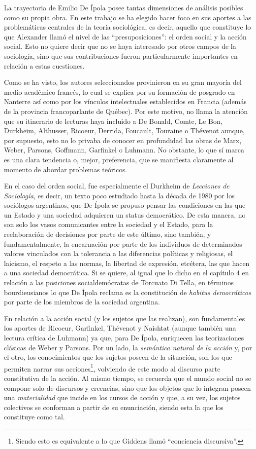 La trayectoria de Emilio De Ípola posee tantas dimensiones de análisis posibles como su propia obra. En este trabajo se ha elegido hacer foco en sus aportes a las problemáticas centrales de la teoría sociológica, es decir, aquello que constituye lo que Alexander llamó el nivel de las \enquote{presuposiciones}: el orden social y la acción social. Esto no quiere decir que no se haya interesado por otros campos de la sociología, sino que sus contribuciones fueron particularmente importantes en relación a estas cuestiones.

Como se ha visto, los autores seleccionados provinieron en su gran mayoría del medio académico francés, lo cual se explica por su formación de posgrado en Nanterre así como por los vínculos intelectuales establecidos en Francia (además de la provincia francoparlante de Québec). Por este motivo, no llama la atención que su itinerario de lecturas haya incluido a De Bonald, Comte, Le Bon, Durkheim, Althusser, Ricoeur, Derrida, Foucault, Touraine o Thévenot aunque, por supuesto, esto no lo privaba de conocer en profundidad las obras de Marx, Weber, Parsons, Goffmann, Garfinkel o Luhmann. No obstante, lo que sí marca es una clara tendencia o, mejor, preferencia, que se manifiesta claramente al momento de abordar problemas teóricos.

En el caso del orden social, fue especialmente el Durkheim de \emph{Lecciones de Sociología}, es decir, un texto poco estudiado hasta la década de 1980 por los sociólogos argentinos, que De Ípola se propuso pensar las condiciones en las que un Estado y una sociedad adquieren un status democrático. De esta manera, no son solo los vasos comunicantes entre la sociedad y el Estado, para la reelaboración de decisiones por parte de este último, sino también, y fundamentalmente, la encarnación por parte de los individuos de determinados valores vinculados con la tolerancia a las diferencias políticas y religiosas, el laicismo, el respeto a las normas, la libertad de expresión, etcétera, las que hacen a una sociedad democrática. Si se quiere, al igual que lo dicho en el capítulo 4 en relación a las posiciones socialdemócratas de Torcuato Di Tella, en términos bourdieusianos lo que De Ípola reclama es la constitución de \emph{habitus democráticos} por parte de los miembros de la sociedad argentina.

En relación a la acción social (y los sujetos que las realizan), son fundamentales los aportes de Ricoeur, Garfinkel, Thévenot y Naishtat (aunque también una lectura crítica de Luhmann) ya que, para De Ípola, enriquecen las teorizaciones clásicas de Weber y Parsons. Por un lado, la \emph{semántica natural de la acción} y, por el otro, los conocimientos que los sujetos poseen de la situación, son los que permiten narrar sus acciones\footnote{Siendo esto es equivalente a lo que Giddens llamó \enquote{conciencia discursiva}.}, volviendo de este modo al discurso parte constitutiva de la acción. Al mismo tiempo, se recuerda que el mundo social no se compone solo de discursos y creencias, sino que los objetos que lo integran poseen una \emph{materialidad} que incide en los cursos de acción y que, a su vez, los sujetos colectivos se conforman a partir de su enunciación, siendo esta la que los constituye como tal.

